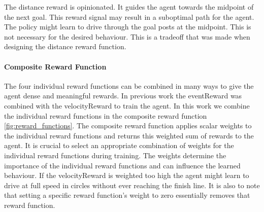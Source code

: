The distance reward is opinionated. It guides the agent towards the midpoint of the next goal. This reward signal may result in a suboptimal path for the agent. The policy might learn to drive through the goal posts at the midpoint. This is not necessary for the desired behaviour. This is a tradeoff that was made when designing the distance reward function.

\paragraph{Composite Reward Function}
The four individual reward functions can be combined in many ways to give the agent dense and meaningful rewards. In previous work the eventReward was combined with the velocityReward to train the agent. In this work we combine the individual reward functions in the composite reward function \ref{fig:reward_functions}. The composite reward function applies scalar weights to the individual reward functions and returns this weighted sum of rewards to the agent. It is crucial to select an appropriate combination of weights for the individual reward functions during training. The weights determine the importance of the individual reward functions and can influence the learned behaviour. If the velocityReward is weighted too high the agent might learn to drive at full speed in circles without ever reaching the finish line. It is also to note that setting a specific reward function's weight to zero essentially removes that reward function.

